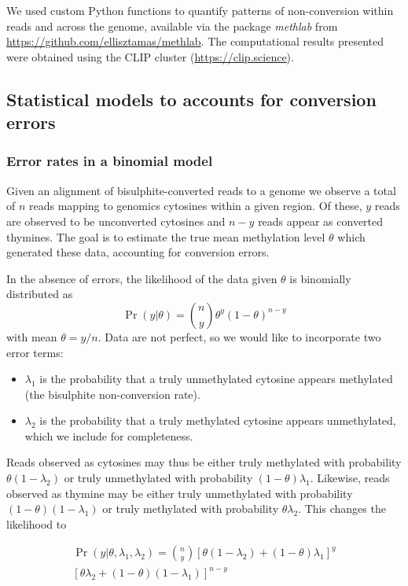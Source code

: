 \documentclass[twocolumn,twoside,lettersize]{article}
\begin{document}
We used custom Python functions to quantify patterns of non-conversion within reads and across the genome, available via the package \textit{methlab} from \url{https://github.com/ellisztamas/methlab}.
The computational results presented were obtained using the CLIP cluster (\url{https://clip.science}).

\subsection{Statistical models to accounts for conversion errors}

\subsubsection{Error rates in a binomial model} \label{sec:binomial-with-errors}

Given an alignment of bisulphite-converted reads to a genome we observe a total of $n$ reads mapping to genomics cytosines within a given region.
Of these, $y$ reads are observed to be unconverted cytosines and $n-y$ reads appear as converted thymines.
The goal is to estimate the true mean methylation level $\theta$ which generated these data, accounting for conversion errors.

In the absence of errors, the likelihood of the data given $\theta$ is binomially distributed as
\begin{equation}
    \label{eqn:classic-binomial}
    \Pr(y| \theta) = {n \choose y} \theta^y(1-\theta)^{n-y}
\end{equation}
with mean $\theta=y/n$.
Data are not perfect, so we would like to incorporate two error terms:
\begin{itemize}
    \item $\lambda_1$ is the probability that a truly unmethylated cytosine appears methylated (the bisulphite non-conversion rate).
    \item $\lambda_2$ is the probability that a truly methylated cytosine appears unmethylated, which we include for completeness.
\end{itemize}
Reads observed as cytosines may thus be either truly methylated with probability $\theta(1-\lambda_2)$ or truly unmethylated with probability $(1-\theta)\lambda_1$. Likewise, reads observed as thymine may be either truly unmethylated with probability $(1-\theta)(1-\lambda_1)$ or truly methylated with probability $\theta \lambda_2$.
This changes the likelihood to

\begin{equation}
\begin{split}
    \label{eqn:binom-with-errors}
    \Pr(y | \theta, \lambda_1, \lambda_2) = 
    {n \choose y}
    [\theta(1-\lambda_2) + (1-\theta)\lambda_1]^y \\
    [\theta \lambda_2 + (1-\theta)(1-\lambda_1)]^{n-y}
\end{split}
\end{equation}
\end{document}
